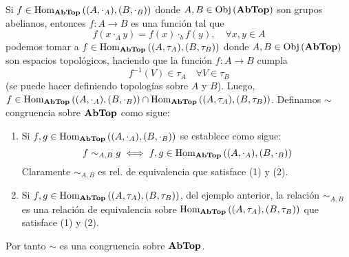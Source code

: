 \documentclass[12pt]{report}
\theoremstyle{largebreak}
\newcommand\cf[3]{\ensuremath{#1:#2\rightarrow#3}}
\newcommand{\Obj}[1]{\ensuremath{\textup{Obj}\left(#1\right)}}
\newcommand{\Hom}[3]{\ensuremath{\textup{Hom}_{#1}\left(#2,#3\right)}}
\newcommand{\Cat}[1]{\ensuremath{\textup{\textbf{#1}}}}
\begin{document}
    \begin{obs}
        Si $f\in\Hom{\Cat{AbTop}}{(A,\cdot_A)}{(B,\cdot_B)}$ donde $A,B\in\Obj{\Cat{AbTop}}$ son grupos abelianos, entonces $\cf{f}{A}{B}$ es una función tal que
        \begin{equation*}
            f(x\cdot_Ay)=f(x)\cdot_bf(y),\quad\forall x,y\in A
        \end{equation*}
        podemos tomar a $f\in\Hom{\Cat{AbTop}}{(A,\tau_A)}{(B,\tau_B)}$ donde $A,B\in\Obj{\Cat{AbTop}}$ son espacios topológicos, haciendo que la función $\cf{f}{A}{B}$ cumpla
        \begin{equation*}
            f^{-1}(V)\in\tau_A\quad\forall V\in\tau_B
        \end{equation*}
        (se puede hacer definiendo topologías sobre $A$ y $B$). Luego, $f\in\Hom{\Cat{AbTop}}{(A,\cdot_A)}{(B,\cdot_B)}\cap\Hom{\Cat{AbTop}}{(A,\tau_A)}{(B,\tau_B)}$. Definamos $\sim$ congruencia sobre $\Cat{AbTop}$ como sigue:
        \begin{enumerate}
            \item Si $f,g\in\Hom{\Cat{AbTop}}{(A,\cdot_A)}{(B,\cdot_B)}$ se establece como sigue:
            \begin{equation*}
                f\sim_{A,B}g\iff f,g\in \Hom{\Cat{AbTop}}{(A,\cdot_A)}{(B,\cdot_B)}
            \end{equation*}
            Claramente $\sim_{A,B}$ es rel. de equivalencia que satisface (1) y (2).
            \item Si $f,g\in\Hom{\Cat{AbTop}}{(A,\tau_A)}{(B,\tau_B)}$, del ejemplo anterior, la relación $\sim_{A,B}$ es una relación de equivalencia sobre $\Hom{\Cat{AbTop}}{(A,\tau_A)}{(B,\tau_B)}$ que satisface (1) y (2).
        \end{enumerate}
        Por tanto $\sim$ es una congruencia sobre $\Cat{AbTop}$.
    \end{obs}
\end{document}
